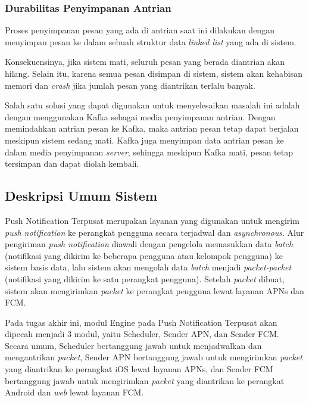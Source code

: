 \subsubsection{Durabilitas Penyimpanan Antrian}
\par Proses penyimpanan pesan yang ada di antrian saat ini dilakukan dengan menyimpan pesan ke dalam sebuah struktur data \textit{linked list} yang ada di sistem.
\par Konsekuensinya, jika sistem mati, seluruh pesan yang berada diantrian akan hilang. Selain itu, karena semua pesan disimpan di sistem, sistem akan kehabisan memori dan \textit{crash} jika jumlah pesan yang diantrikan terlalu banyak.
\par Salah satu solusi yang dapat digunakan untuk menyelesaikan masalah ini adalah dengan menggunakan Kafka sebagai media penyimpanan antrian. Dengan memindahkan antrian pesan ke Kafka, maka antrian pesan tetap dapat berjalan meskipun sistem sedang mati. Kafka juga menyimpan data antrian pesan ke dalam media penyimpanan \textit{server}, sehingga meskipun Kafka mati, pesan tetap tersimpan dan dapat diolah kembali.

\subsection{Deskripsi Umum Sistem}
\par Push Notification Terpusat merupakan layanan yang digunakan untuk mengirim \textit{push notification} ke perangkat pengguna secara terjadwal dan \textit{asynchronous}. Alur pengiriman \textit{push notification} diawali dengan pengelola memasukkan data \textit{batch} (notifikasi yang dikirim ke beberapa pengguna atau kelompok pengguna) ke sistem basis data, lalu sistem akan mengolah data \textit{batch} menjadi \textit{packet-packet} (notifikasi yang dikirim ke satu perangkat pengguna). Setelah \textit{packet} dibuat, sistem akan mengirimkan \textit{packet} ke perangkat pengguna lewat layanan APNs dan FCM.
\par Pada tugas akhir ini, modul Engine pada Push Notification Terpusat akan dipecah menjadi 3 modul, yaitu Scheduler, Sender APN, dan Sender FCM. Secara umum, Scheduler bertanggung jawab untuk menjadwalkan dan mengantrikan \textit{packet}, Sender APN bertanggung jawab untuk mengirimkan \textit{packet} yang diantrikan ke perangkat iOS lewat layanan APNs, dan Sender FCM bertanggung jawab untuk mengirimkan \textit{packet} yang diantrikan ke perangkat Android dan \textit{web} lewat layanan FCM.

